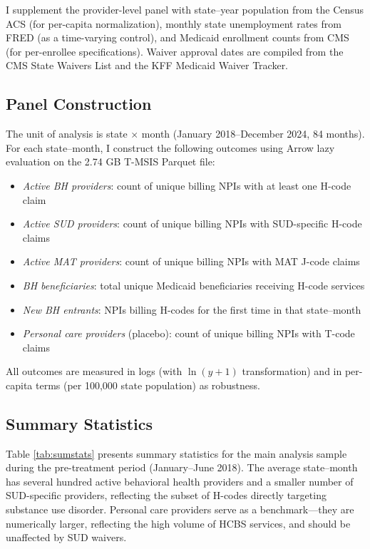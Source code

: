 \documentclass[12pt]{article}
\begin{document}
I supplement the provider-level panel with state--year population from the Census ACS (for per-capita normalization), monthly state unemployment rates from FRED (as a time-varying control), and Medicaid enrollment counts from CMS (for per-enrollee specifications). Waiver approval dates are compiled from the CMS State Waivers List and the KFF Medicaid Waiver Tracker.

\subsection{Panel Construction}

The unit of analysis is state $\times$ month (January 2018--December 2024, 84 months). For each state--month, I construct the following outcomes using Arrow lazy evaluation on the 2.74 GB T-MSIS Parquet file:

\begin{itemize}
    \item \textit{Active BH providers}: count of unique billing NPIs with at least one H-code claim
    \item \textit{Active SUD providers}: count of unique billing NPIs with SUD-specific H-code claims
    \item \textit{Active MAT providers}: count of unique billing NPIs with MAT J-code claims
    \item \textit{BH beneficiaries}: total unique Medicaid beneficiaries receiving H-code services
    \item \textit{New BH entrants}: NPIs billing H-codes for the first time in that state--month
    \item \textit{Personal care providers} (placebo): count of unique billing NPIs with T-code claims
\end{itemize}

All outcomes are measured in logs (with $\ln(y+1)$ transformation) and in per-capita terms (per 100,000 state population) as robustness.

\subsection{Summary Statistics}



Table \ref{tab:sumstats} presents summary statistics for the main analysis sample during the pre-treatment period (January--June 2018). The average state--month has several hundred active behavioral health providers and a smaller number of SUD-specific providers, reflecting the subset of H-codes directly targeting substance use disorder. Personal care providers serve as a benchmark---they are numerically larger, reflecting the high volume of HCBS services, and should be unaffected by SUD waivers.
\end{document}
